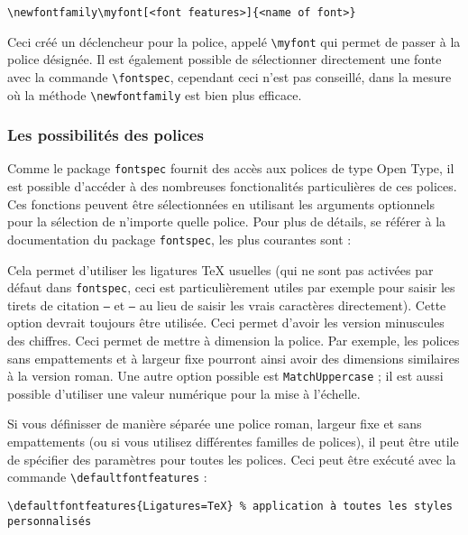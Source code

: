 \begin{lstlisting}[language={[LaTeX]TeX}]
  \newfontfamily\myfont[<font features>]{<name of font>}
\end{lstlisting}

Ceci créé un déclencheur pour la police, appelé \texttt{\textbackslash myfont} qui permet de passer à la police désignée. Il est également possible de sélectionner directement une fonte avec la commande \texttt{\textbackslash fontspec}, cependant ceci n'est pas conseillé, dans la mesure où la méthode \texttt{\textbackslash newfontfamily} est bien plus efficace.

\subsubsection{Les possibilités des polices}
Comme le package \texttt{fontspec} fournit des accès aux polices de type Open Type, il est possible d'accéder à des nombreuses fonctionalités particulières de ces polices. Ces fonctions peuvent être sélectionnées en utilisant les arguments optionnels pour la sélection de n'importe quelle police. Pour plus de détails, se référer à la documentation du package \texttt{fontspec}, les plus courantes sont :
\begin{itemize}
  \itemperso{\texttt{[Ligatures=TeX]}}Cela permet d'utiliser les ligatures \TeX{} usuelles (qui ne sont pas activées par défaut dans \texttt{fontspec}, ceci est particulièrement utiles par exemple pour saisir les tirets de citation \texttt{--} et \texttt{---} au lieu de saisir les vrais caractères directement). Cette option devrait toujours être utilisée.
  \itemperso{\texttt{[Numbers=OldStyle]}}Ceci permet d'avoir les version minuscules des chiffres.
  \itemperso{\texttt{[Scale=MatchLowercase]}}Ceci permet de mettre à dimension la police. Par exemple, les polices sans empattements et à largeur fixe pourront ainsi avoir des dimensions similaires à la version roman. Une autre option possible est \texttt{MatchUppercase} ; il est aussi possible d'utiliser une valeur numérique pour la mise à l'échelle.
\end{itemize}

Si vous définisser de manière séparée une police roman, largeur fixe et sans empattements (ou si vous utilisez différentes familles de polices), il peut être utile de spécifier des paramètres pour toutes les polices. Ceci peut être exécuté avec la commande \texttt{\textbackslash defaultfontfeatures} :

\begin{lstlisting}[language={[LaTeX]TeX}]
  \defaultfontfeatures{Ligatures=TeX} % application à toutes les styles personnalisés
\end{lstlisting}

